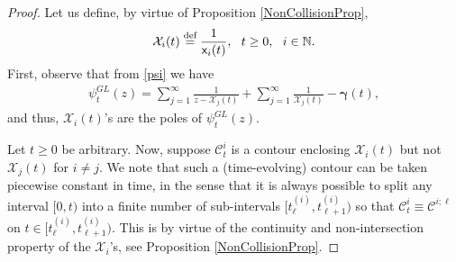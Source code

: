 \documentclass[]{article}
\begin{document}
\begin{proof}
Let us define, by virtue of Proposition \ref{NonCollisionProp}, 
\begin{align*}
\mathcal{X}_i(t)\overset{\textnormal{def}}{=}\frac{1}{\mathsf{x}_i(t)}, \  \  t\ge 0,\  \ i\in\mathbb{N}.
\end{align*}
First, observe that from \eqref{psi}  we have
\begin{align}\label{psiInvPoints-IL}
    \psi_t^{GL}(z)
=
\sum_{j=1}^\infty
\frac{1}{z-\mathcal{X}_j(t)}
+ 
\sum_{j=1}^\infty
\frac{1}{\mathcal{X}_j(t)}
-
\boldsymbol{\gamma}(t),
\end{align}
and thus, $\mathcal{X}_i(t)$'s are the poles of $\psi_t^{GL}(z)$.


Let $t\ge 0$ be arbitrary. Now, suppose
$\mathscr{C}_t^i$ is a contour enclosing 
$\mathcal{X}_i(t)$
but not 
$\mathcal{X}_j(t)$ for $i\neq j$.  We note that such a (time-evolving) contour can be taken piecewise constant in time, in the sense that it is always possible to split any interval $[0,t)$ into a finite number of sub-intervals $[t_\ell^{(i)},t_{\ell+1}^{(i)})$ so that $\mathscr{C}_t^{i}\equiv\mathscr{C}^{i;\ell}$ on $t \in [t_\ell^{(i)},t_{\ell+1}^{(i)})$. This is by virtue of the continuity and non-intersection property of the $\mathcal{X}_i$'s, see Proposition \ref{NonCollisionProp}. 


\end{proof}
\end{document}
